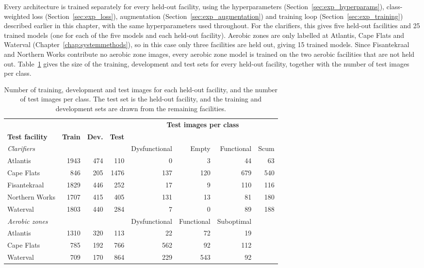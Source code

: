 Every architecture is trained separately for every held-out facility, using the hyperparameters (Section~\ref{sec:exp_hyperparams}), class-weighted loss (Section~\ref{sec:exp_loss}), augmentation (Section~\ref{sec:exp_augmentation}) and training loop (Section~\ref{sec:exp_training}) described earlier in this chapter, with the same hyperparameters used throughout. For the clarifiers, this gives five held-out facilities and 25 trained models (one for each of the five models and each held-out facility). Aerobic zones are only labelled at Atlantis, Cape Flats and Waterval (Chapter~\ref{chap:systemmethods}), so in this case only three facilities are held out, giving 15 trained models. Since Fisantekraal and Northern Works contribute no aerobic zone images, every aerobic zone model is trained on the two aerobic facilities that are not held out. Table~\ref{tab:lofo_folds} gives the size of the training, development and test sets for every held-out facility, together with the number of test images per class.

\begin{table}[htbp]
\centering
\setlength{\tabcolsep}{4pt}
\caption{Number of training, development and test images for each held-out facility, and the number of test images per class. The test set is the held-out facility, and the training and development sets are drawn from the remaining facilities.}
\label{tab:lofo_folds}
\begin{tabular}{l rrr rrrr}
\toprule
& & & & \multicolumn{4}{c}{\textbf{Test images per class}} \\
\cmidrule(lr){5-8}
\textbf{Test facility} & \textbf{Train} & \textbf{Dev.} & \textbf{Test} & & & & \\
\midrule
\textit{Clarifiers} & & & & Dysfunctional & Empty & Functional & Scum \\
\cmidrule(lr){5-8}
Atlantis       & 1943 & 474 & 110  & 0   & 3   & 44  & 63  \\
Cape Flats     & 846  & 205 & 1476 & 137 & 120 & 679 & 540 \\
Fisantekraal   & 1829 & 446 & 252  & 17  & 9   & 110 & 116 \\
Northern Works & 1707 & 415 & 405  & 131 & 13  & 81  & 180 \\
Waterval       & 1803 & 440 & 284  & 7   & 0   & 89  & 188 \\
\midrule
\textit{Aerobic zones} & & & & Dysfunctional & Functional & Suboptimal & \\
\cmidrule(lr){5-7}
Atlantis       & 1310 & 320 & 113  & 22  & 72  & 19  & \\
Cape Flats     & 785  & 192 & 766  & 562 & 92  & 112 & \\
Waterval       & 709  & 170 & 864  & 229 & 543 & 92  & \\
\bottomrule
\end{tabular}
\end{table}

